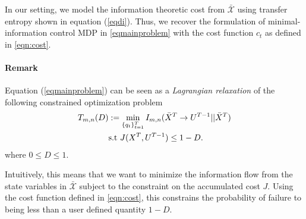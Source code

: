 

In our setting, we model the information theoretic cost from $\mathcal{\bar{X}}$ using transfer entropy shown in equation (\ref{eqdi}). Thus, we recover the formulation of minimal-information control MDP in \eqref{eqmainproblem} with the cost function $c_t$ as defined in \eqref{eqn:cost}. 

\paragraph*{Remark} Equation (\ref{eqmainproblem}) can be seen as a \emph{Lagrangian relaxation} of the following constrained optimization problem
\vspace{-0.5cm}
\begin{align}\label{eqn:constopt}
T_{m,n}(D) & := \min_{\{q_t\}_{t=1}^T} I_{m,n}(\bar{X}^T \rightarrow U^{T-1}||\bar{X}^T) \\
& \textrm{s.t } J(X^{T},U^{T-1}) \leq 1 - D. \nonumber
\end{align}
where $0\leq D \leq 1$.

Intuitively, this means that we want to minimize the information flow from the state variables in $\mathcal{\bar{X}}$ subject to the constraint on the accumulated cost $J$. Using the cost function defined in \eqref{eqn:cost}, this constrains the probability of failure to being less than a user defined quantity $1-D$. 


